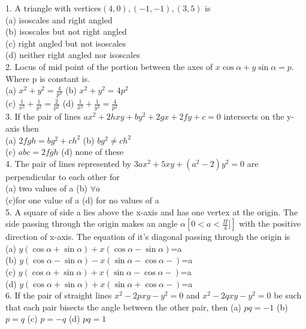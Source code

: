 \documentclass[12pt]{article}
\begin{document}
1. A triangle with vertices$(4,0),(-1,-1 ),(3,5)$ is\\
(a) isoscales and right angled\\
(b) isoscales  but not right angled\\
(c) right angled but not isoscales \\
(d) neither right angled nor isoscales \\
2. Locus of mid point of the portion between the axes of $x\cos\alpha+y\sin\alpha=p$. Where p is constant is.\\
(a) $x^2+y^2=\frac{4}{p^2}$ \hspace{1cm} (b) $x^2+y^2=4p^2$\\
(c) $\frac{1}{x^2}+\frac{1}{y^2}=\frac{2}{p^2}$ \hspace{1cm}(d) $\frac{1}{x^2}+\frac{1}{y^2}=\frac{4}{p^2}$ \\
3. If the pair of lines $ax^2+2hxy+by^2+2gx+2fy+c=0$ intersects on the y-axis then\\
(a) $2fgh=bg^2+ch^2$ \hspace{1cm} (b) $bg^2\neq ch^2$\\
(c) $abc=2fgh$\hspace{1cm}  (d) none of these\\
4. The pair of lines represented by $3ax^2+5xy+(a^2-2)y^2=0$ are perpendicular to each other for \\
(a) two values of a\hspace{1cm} (b) $\forall a$\\
(c)for one value of a \hspace{1cm} (d) for no values of a\\
5. A square of side a lies above the x-axis and has one vertex at the origin. The side passing through the origin makes an angle $\alpha \left[ 0<a<\frac{\Pi}{4}]\right]$ with the positive direction of x-axis. The equation of it's diagonal passing through the origin is \\
(a) $y(\cos\alpha+\sin\alpha)+x(\cos\alpha-\sin\alpha)$=a\\
(b) $y(\cos\alpha-\sin\alpha)-x(\sin\alpha-\cos\alpha-)$=a\\
(c) $y(\cos\alpha+\sin\alpha)+x(\sin\alpha-\cos\alpha-)$=a\\
(d) $y(\cos\alpha+\sin\alpha)+x(\sin\alpha+\cos\alpha-)$=a\\
6. If the pair of straight lines $x^2-2pxy-y^2=0$ and $x^2-2qxy-y^2=0$ be such that each pair bisects the angle between the other pair, then 
(a) $pq=-1$  \hspace{1cm} (b) $p=q$  \hspace{1cm} (c) $p=-q$  \hspace{1cm} (d) $pq=1$\\
\end{document}
